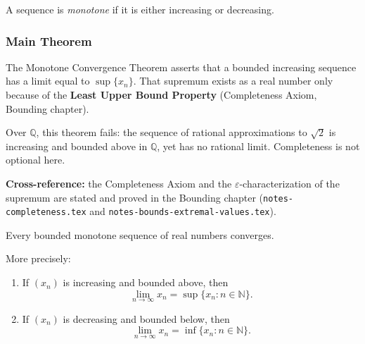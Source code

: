 \begin{tcolorbox}[colback=propbox, colframe=propborder, arc=2pt,
  left=6pt, right=6pt, top=4pt, bottom=4pt,
  title={\small\textbf{Definition (Monotone sequence)}},
  fonttitle=\small\bfseries]
A sequence is \emph{monotone} if it is either increasing or decreasing.
\end{tcolorbox}

\subsubsection{Main Theorem}

\begin{remark*}
The Monotone Convergence Theorem asserts that a bounded increasing sequence
has a limit equal to $\sup\{x_n\}$.  That supremum exists as a real number
only because of the \textbf{Least Upper Bound Property}
(Completeness Axiom, Bounding chapter).

Over $\mathbb{Q}$, this theorem fails: the sequence of rational approximations
to $\sqrt{2}$ is increasing and bounded above in $\mathbb{Q}$, yet has no
rational limit.  Completeness is not optional here.

\medskip
\textbf{Cross-reference:} the Completeness Axiom and the
$\varepsilon$-characterization of the supremum are stated and proved in
the Bounding chapter (\texttt{notes-completeness.tex} and
\texttt{notes-bounds-extremal-values.tex}).
\end{remark*}

\begin{theorem}
Every bounded monotone sequence of real numbers converges.

More precisely:

\begin{enumerate}
\item If $(x_n)$ is increasing and bounded above, then
\[
\lim_{n\to\infty} x_n = \sup\{x_n : n\in\mathbb{N}\}.
\]

\item If $(x_n)$ is decreasing and bounded below, then
\[
\lim_{n\to\infty} x_n = \inf\{x_n : n\in\mathbb{N}\}.
\]
\end{enumerate}
\end{theorem}



